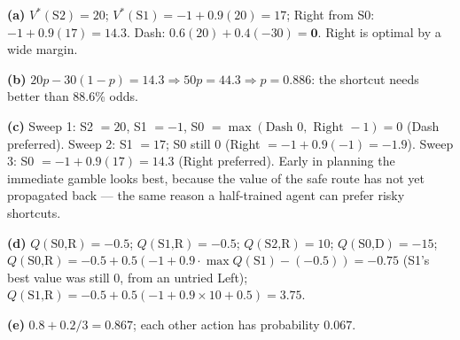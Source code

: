 \documentclass[11pt]{article}
\begin{document}
\begin{soln}\textbf{(a)} $V^*(\text{S2})=20$; $V^*(\text{S1})=-1+0.9(20)=17$; Right from S0: $-1+0.9(17)=\mathbf{14.3}$. Dash: $0.6(20)+0.4(-30)=\mathbf{0}$. Right is optimal by a wide margin.

\textbf{(b)} $20p-30(1-p)=14.3\Rightarrow50p=44.3\Rightarrow p=\mathbf{0.886}$: the shortcut needs better than 88.6\% odds.

\textbf{(c)} Sweep 1: S2 $=20$, S1 $=-1$, S0 $=\max(\text{Dash }0,\text{ Right }-1)=0$ (Dash preferred). Sweep 2: S1 $=17$; S0 still 0 (Right $=-1+0.9(-1)=-1.9$). Sweep 3: S0 $=-1+0.9(17)=14.3$ (Right preferred). Early in planning the immediate gamble looks best, because the value of the safe route has not yet propagated back --- the same reason a half-trained agent can prefer risky shortcuts.

\textbf{(d)} $Q(\text{S0,R})=-0.5$; $Q(\text{S1,R})=-0.5$; $Q(\text{S2,R})=10$; $Q(\text{S0,D})=-15$; $Q(\text{S0,R})=-0.5+0.5(-1+0.9\cdot\max Q(\text{S1})-(-0.5))=-0.75$ (S1's best value was still 0, from an untried Left); $Q(\text{S1,R})=-0.5+0.5(-1+0.9\times10+0.5)=\mathbf{3.75}$.

\textbf{(e)} $0.8+0.2/3=\mathbf{0.867}$; each other action has probability $0.067$.\end{soln}
\end{document}

